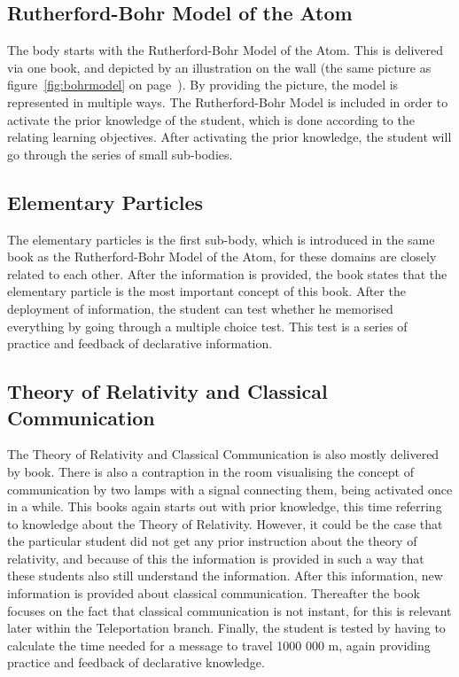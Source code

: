 \documentclass[11pt,twoside]{report} %
\begin{document}
\subsection{Rutherford-Bohr Model of the Atom}

The body starts with the Rutherford-Bohr Model of the Atom. This is delivered via one book, and depicted by an illustration on the wall (the same picture as figure~\ref{fig:bohrmodel} on page~\pageref{fig:bohrmodel}). By providing the picture, the model is represented in multiple ways. The Rutherford-Bohr Model is included in order to activate the prior knowledge of the student, which is done according to the relating learning objectives. After activating the prior knowledge, the student will go through the series of small sub-bodies.

\subsection{Elementary Particles}

The elementary particles is the first sub-body, which is introduced in the same book as the Rutherford-Bohr Model of the Atom, for these domains are closely related to each other. After the information is provided, the book states that the elementary particle is the most important concept of this book. After the deployment of information, the student can test whether he memorised everything by going through a multiple choice test. This test is a series of practice and feedback of declarative information.

\subsection{Theory of Relativity and Classical Communication}

The Theory of Relativity and Classical Communication is also mostly delivered by book. There is also a contraption in the room visualising the concept of communication by two lamps with a signal connecting them, being activated once in a while. This books again starts out with prior knowledge, this time referring to knowledge about the Theory of Relativity. However, it could be the case that the particular student did not get any prior instruction about the theory of relativity, and because of this the information is provided in such a way that these students also still understand the information. After this information, new information is provided about classical communication. Thereafter the book focuses on the fact that classical communication is not instant, for this is relevant later within the Teleportation branch. Finally, the student is tested by having to calculate the time needed for a message to travel 1000 000 m, again providing practice and feedback of declarative knowledge.
\end{document}

